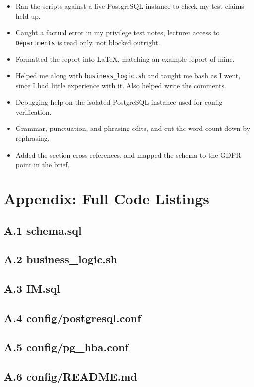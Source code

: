 \documentclass[12pt,a4paper]{article}
\begin{document}
\begin{itemize}
    \item Ran the scripts against a live PostgreSQL instance to check my test claims held up.
    \item Caught a factual error in my privilege test notes, lecturer access to \lstinline|Departments| is read only, not blocked outright.
    \item Formatted the report into LaTeX, matching an example report of mine.
    \item Helped me along with \lstinline|business_logic.sh| and taught me bash as I went, since I had little experience with it. Also helped write the comments.
    \item Debugging help on the isolated PostgreSQL instance used for config verification.
    \item Grammar, punctuation, and phrasing edits, and cut the word count down by rephrasing.
    \item Added the section cross references, and mapped the schema to the GDPR point in the brief.
\end{itemize}

\newpage
\section*{Appendix: Full Code Listings}

\subsection*{A.1 schema.sql}


\subsection*{A.2 business\_logic.sh}


\subsection*{A.3 IM.sql}


\subsection*{A.4 config/postgresql.conf}


\subsection*{A.5 config/pg\_hba.conf}


\subsection*{A.6 config/README.md}

\end{document}

